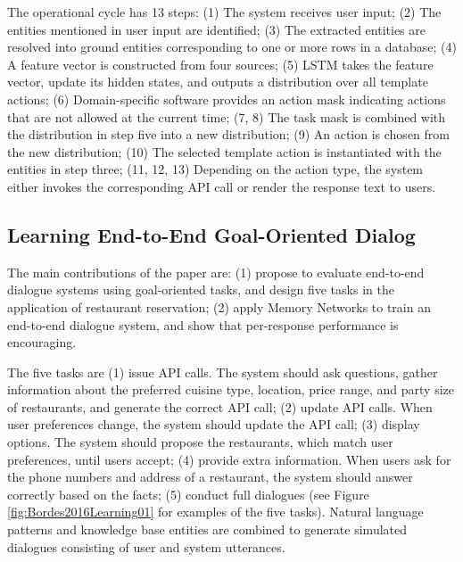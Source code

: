 \documentclass[paper=a4, fontsize=18pt]{article} %
\numberwithin{equation}{section} %
\numberwithin{figure}{section} %
\numberwithin{table}{section} %
\begin{document}
The operational cycle has 13 steps: (1) The system receives user input; (2) The entities mentioned in user input are identified; (3) The extracted entities are resolved into ground entities corresponding to one or more rows in a database; (4) A feature vector is constructed from four sources; (5) LSTM takes the feature vector, update its hidden states, and outputs a distribution over all template actions; (6) Domain-specific software provides an action mask indicating actions that are not allowed at the current time; (7, 8) The task mask is combined with the distribution in step five into a new distribution; (9) An action is chosen from the new distribution; (10) The selected template action is instantiated with the entities in step three; (11, 12, 13) Depending on the action type, the system either invokes the corresponding API call or render the response text to users.

\subsection{Learning End-to-End Goal-Oriented Dialog \cite{Bordes2016Learning}}

The main contributions of the paper are: (1) propose to evaluate end-to-end dialogue systems using goal-oriented tasks, and design five tasks in the application of restaurant reservation; (2) apply Memory Networks to train an end-to-end dialogue system, and show that per-response performance is encouraging.

The five tasks are (1) issue API calls. The system should ask questions, gather information about the preferred cuisine type, location, price range, and party size of restaurants, and generate the correct API call; (2) update API calls. When user preferences change, the system should update the API call; (3) display options. The system should propose the restaurants, which match user preferences, until users accept; (4) provide extra information. When users ask for the phone numbers and address of a restaurant, the system should answer correctly based on the facts; (5) conduct full dialogues (see Figure \ref{fig:Bordes2016Learning01} for examples of the five tasks). Natural language patterns and knowledge base entities are combined to generate simulated dialogues consisting of user and system utterances.
\end{document}
